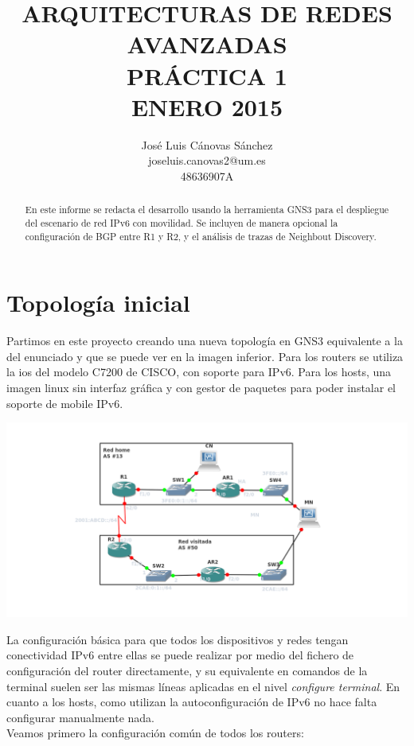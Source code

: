 \documentclass{article}
\author{José Luis Cánovas Sánchez\\joseluis.canovas2@um.es\\48636907A}
\title{ARQUITECTURAS DE REDES AVANZADAS\\PRÁCTICA 1\\ ENERO 2015}
\date{}
\begin{document}
\maketitle

\begin{abstract}
	En este informe se redacta el desarrollo usando la herramienta GNS3 para el despliegue del escenario de red IPv6 con movilidad. Se incluyen de manera opcional la configuración de BGP entre R1 y R2, y el análisis de trazas de Neighbout Discovery.
\end{abstract}

\tableofcontents
\section{Topología inicial}
Partimos en este proyecto creando una nueva topología en GNS3 equivalente a la del enunciado y que se puede ver en la imagen inferior. Para los routers se utiliza la ios del modelo C7200 de CISCO, con soporte para IPv6. Para los hosts, una imagen linux sin interfaz gráfica y con gestor de paquetes para poder instalar el soporte de mobile IPv6.\par

\begin{center}
	\includegraphics[scale=0.5]{images/topologyInic.png}
\end{center}

La configuración básica para que todos los dispositivos y redes tengan conectividad IPv6 entre ellas se puede realizar por medio del fichero de configuración del router directamente, y su equivalente en comandos de la terminal suelen ser las mismas líneas aplicadas en el nivel \textit{configure terminal}. En cuanto a los hosts, como utilizan la autoconfiguración de IPv6 no hace falta configurar manualmente nada.
\\

Veamos primero la configuración común de todos los routers:
\end{document}

